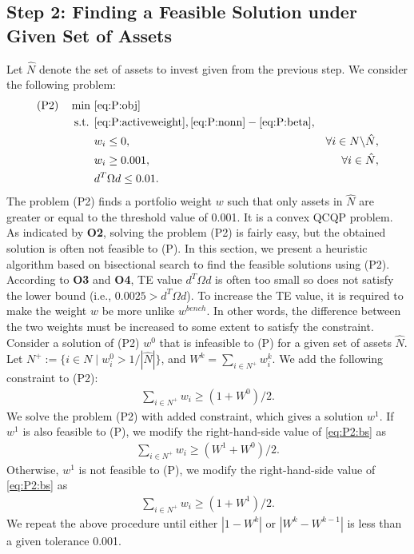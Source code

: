 \documentclass[11pt]{article}
\begin{document}
\subsection{Step 2: Finding a Feasible Solution under Given Set of Assets}

Let $\hat{N}$ denote the set of assets to invest given from the previous step. We consider the following problem:
\begin{align*}
\text{(P2)} \quad \min~ &\eqref{eq:P:obj}\\
\text{s.t. } 
& \eqref{eq:P:activeweight}, \eqref{eq:P:nonn} - \eqref{eq:P:beta}, \notag\\
& w_i \le 0, & \forall i \in N \backslash \hat{N}, \\
& w_i \geq 0.001, & \forall i \in \hat{N}, \\
& d^T \Omega d \leq 0.01. & 
\end{align*} 
The problem (P2) finds a portfolio weight $w$ such that only assets in $\hat{N}$ are greater or equal to the threshold value of 0.001. It is a convex QCQP problem. As indicated by \textbf{O2}, solving the problem (P2) is fairly easy, but the obtained solution is often not feasible to (P). In this section, we present a heuristic algorithm based on bisectional search to find the feasible solutions using (P2). According to \textbf{O3} and \textbf{O4}, TE value $d^T \Omega d$ is often too small so does not satisfy the lower bound (i.e., $0.0025 > d^T \Omega d$). To increase the TE value, it is required to make the weight $w$ be more unlike $w^{bench}$. In other words, the difference between the two weights must be increased to some extent to satisfy the constraint. Consider a solution of (P2) $w^0$ that is infeasible to (P) for a given set of assets $\hat{N}$. Let $N^+ := \{i \in N \mid w^0_i > 1/|\hat{N}| \}$, and $W^k = \sum_{i \in N^+} w^k_i$. We add the following constraint to (P2):
\begin{align}
\sum_{i \in N^+} w_i \ge (1+W^0)/2. \label{eq:P2:bs}
\end{align}
We solve the problem (P2) with added constraint, which gives a solution $w^1$. If $w^1$ is also feasible to (P), we modify the right-hand-side value of \eqref{eq:P2:bs} as
\begin{align*}
\sum_{i \in N^+} w_i \ge (W^1+W^0)/2.
\end{align*}
Otherwise, $w^1$ is not feasible to (P), we modify the right-hand-side value of \eqref{eq:P2:bs} as
\begin{align*}
\sum_{i \in N^+} w_i \ge (1+W^1)/2.
\end{align*}
We repeat the above procedure until either $|1-W^k|$ or $|W^k-W^{k-1}|$ is less than a given tolerance 0.001. 
\end{document}
